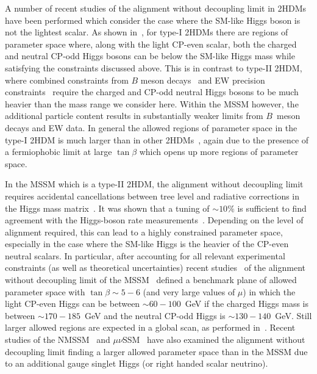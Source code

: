 \documentclass[../report.tex]{subfiles}
\begin{document}
\label{sec:models}

A number of recent studies of the alignment without decoupling limit in
2HDMs have been performed which consider the case where the SM-like
Higgs boson is not the lightest scalar. As shown
in~\cite{Ilisie:2014hea,Bernon:2015wef,Enberg:2016ygw,Arhrib:2017wmo,Arbey:2017gmh,Bhatia:2017ttp,Fox:2017uwr,Haber:2017erd,Haisch:2017gql},
for type-I 2HDMs there are regions of parameter space where, along with
the light CP-even scalar, both the charged and neutral CP-odd Higgs
bosons can be below the SM-like Higgs mass while satisfying the
constraints discussed above. This is in contrast to type-II 2HDM,
where combined constraints from $B$ meson
decays~\cite{Misiak:2015xwa} and EW precision
constraints~\cite{Peskin:1991sw} require the charged and CP-odd neutral
Higgs bosons to be much heavier than the mass range we consider here. Within the MSSM however, the additional particle content results in
  substantially weaker limits from $B$~meson decays and EW data.
In general the allowed regions of parameter space in the type-I 2HDM is
much larger than in other 2HDMs~\cite{Bernon:2015wef,Haber:2017erd},
again due to the presence of a fermiophobic limit at large $\tan\beta$
which opens up more regions of parameter space. 

In the MSSM which is a type-II 2HDM, the alignment without decoupling
limit~\cite{Carena:2013ooa} requires accidental cancellations between
tree level and radiative corrections in the Higgs mass
matrix~\cite{Bechtle:2016kui,Haber:2017erd}. It was shown that a tuning of $\sim 10\%$ is sufficient to find agreement with the Higgs-boson rate measurements~\cite{Bechtle:2016kui}. Depending on the level of alignment required, this can lead to a highly constrained parameter space, especially in the case where the SM-like Higgs is the heavier of the CP-even neutral scalars. In particular, after accounting for all relevant experimental constraints (as well as theoretical uncertainties) recent studies~\cite{Bahl:2018zmf} of the alignment without decoupling limit of the MSSM~\cite{Carena:2013ooa} defined a benchmark plane of allowed parameter space with $\tan\beta \sim 5 - 6$ (and very large values of $\mu$) in which the light CP-even Higgs can be between  $\sim 60 - 100$~GeV if the charged Higgs mass is between $\sim 170 - 185$~GeV and the neutral CP-odd Higgs is $\sim 130 - 140$~GeV. Still larger allowed regions are expected in a global scan, as performed in~\cite{Bechtle:2016kui}.
Recent studies of the NMSSM~\cite{Carena:2015moc,Domingo:2018uim} and
$\mu\nu$SSM~\cite{Biekotter:2017xmf} have also examined the alignment
without decoupling limit finding a larger allowed parameter space than in the
MSSM due to an additional gauge singlet Higgs (or right handed scalar
neutrino). 
\end{document}
